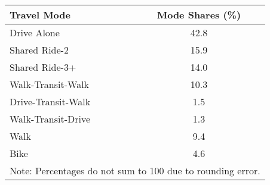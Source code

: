 \begin{tabular}{lc}
\toprule
Travel Mode &  Mode Shares (\%) \\
\midrule
Drive Alone        &             42.8 \\
Shared Ride-2      &             15.9 \\
Shared Ride-3+     &             14.0 \\
Walk-Transit-Walk  &             10.3 \\
Drive-Transit-Walk &              \hphantom{*}1.5 \\
Walk-Transit-Drive &              \hphantom{*}1.3 \\
Walk               &              \hphantom{*}9.4 \\
Bike               &              \hphantom{*}4.6 \\
\bottomrule
\multicolumn{2}{l}{Note: Percentages do not sum to 100 due to rounding error.}
\end{tabular}